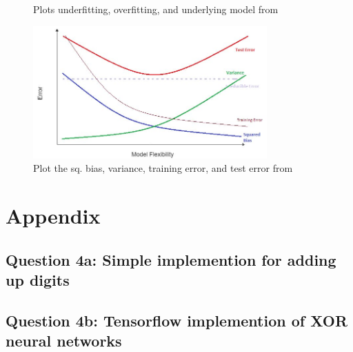 \documentclass{kthreport}
\begin{document}
\begin{figure}[!h]
\begin{minipage}{.5\linewidth}
{        }
    \end{minipage}\par\medskip
    \centering
    \label{fig:main}
    \caption{Plots underfitting, overfitting, and underlying model
             from \cite{the-bias-variance-tradeoff}}
\end{figure}


\begin{figure}[!h]
    \centering
    \includegraphics[width=0.8\textwidth]{figs/bias-var-trade.jpg}
    \caption{
        Plot the sq. bias, variance, training error, and test error
        from \cite{the-bias-variance-tradeoff}
    }
    \label{fig:bias-vars-tradeoff}
\end{figure}

\pagebreak



\pagebreak
\appendix
\section{Appendix}
\subsection*{Question 4a: Simple implemention for adding up digits}

\subsection*{Question 4b: Tensorflow implemention of XOR neural networks}

\end{document}
